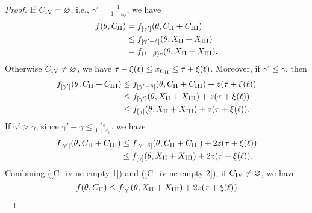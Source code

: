 \begin{proof}
If $ C_\mathrm{\Rnum{4}}=\varnothing $, i.e., $ \gamma'=\frac{1}{1+\varepsilon_0} $, we have 
\begin{align} 	
	f(\theta,C_\mathrm{\Rnum{2}})&=f_{[\gamma']}(\theta,C_\mathrm{\Rnum{2}}+C_\mathrm{\Rnum{3}})\\
	&\leq f_{[\gamma'+\delta]}(\theta,X_\mathrm{\Rnum{2}}+X_\mathrm{\Rnum{3}})\\
	&=f_{(1-\beta)z}(\theta,X_\mathrm{\Rnum{2}}+X_\mathrm{\Rnum{3}}).
	\label{II-1}
\end{align}
Otherwise $ C_\mathrm{\Rnum{4}}\ne\varnothing $, we have $\tau-\xi(\ell)\leq x_{C_\mathrm{\Rnum{2}}}\leq \tau+\xi(\ell) $. Moreover, if $ \gamma'\leq \gamma $, then
\begin{align}
	f_{[\gamma']}(\theta,C_\mathrm{\Rnum{2}}+C_\mathrm{\Rnum{3}})&\leq f_{[\gamma'-\delta]}(\theta,C_\mathrm{\Rnum{2}}+C_\mathrm{\Rnum{3}})+z(\tau+\xi(\ell))\\
	&\leq f_{[\gamma']}(\theta,X_\mathrm{\Rnum{2}}+X_\mathrm{\Rnum{3}})+z(\tau+\xi(\ell))\\
	&\leq f_{[\gamma]}(\theta,X_\mathrm{\Rnum{2}}+X_\mathrm{\Rnum{3}})+z(\tau+\xi(\ell)).\label{C_iv-ne-empty-1}
\end{align}
If $ \gamma' > \gamma $, since $ \gamma'-\gamma\leq \frac{\varepsilon_0}{1+\varepsilon_0} $, we have
\begin{align}
	f_{[\gamma']}(\theta,C_\mathrm{\Rnum{2}}+C_\mathrm{\Rnum{3}})&\leq f_{[\gamma-\delta]}(\theta,C_\mathrm{\Rnum{2}}+C_\mathrm{\Rnum{3}})+2z(\tau+\xi(\ell))\\
	&\leq f_{[\gamma]}(\theta,X_\mathrm{\Rnum{2}}+X_\mathrm{\Rnum{3}})+2z(\tau+\xi(\ell)).\label{C_iv-ne-empty-2}
\end{align}
Combining (\ref{C_iv-ne-empty-1}) and (\ref{C_iv-ne-empty-2}), if $ C_\mathrm{\Rnum{4}}\ne\varnothing $, we have
\begin{equation}
	f(\theta,C_\mathrm{\Rnum{2}})\leq f_{[\gamma]}(\theta,X_\mathrm{\Rnum{2}}+X_\mathrm{\Rnum{3}})+2z(\tau+\xi(\ell))
	\label{II-2}
\end{equation}
	
\end{proof}

